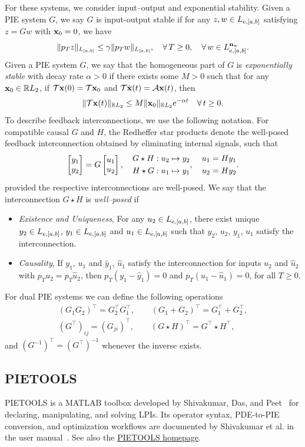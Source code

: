 For these systems, we consider input--output and exponential stability. 
Given a PIE system $G$, we say $G$ is input-output stable if for any $z, w \in L_{{\mathrm{e}},[a,b]}$ satisfying $z = G w$ with $\mathbf{x}_0=0$, we have
\[
\|p_T z\|_{L_{[a,b]}}
\leq
\gamma\|p_T w\|_{L_{[a,b]}},
\quad
\forall\,T\geq0,\quad
\forall\,w\in L_{{\mathrm{e}},[a,b]}^{\mathbf{n}_{{\mathrm{w}}}}.
\]
Given a PIE system $G$, we say that the homogeneous part of $G$
is \emph{exponentially stable} with decay rate $\alpha>0$ if there exists
some $M>0$ such that for any $\mathbf{x}_0\in\mathbb{R} L_2$,
if $\mathcal{T}\mathbf{x}(0) = \mathcal{T}\mathbf{x}_0$ and $\mathcal{T}\dot{\mathbf{x}}(t)
=\mathcal{A}\mathbf{x}(t)$, then
\[\|\mathcal{T}\mathbf{x}(t)\|_{\mathbb{R} L_2} \leq M\|\mathbf{x}_0\|_{\mathbb{R} L_2} e^{-\alpha t} \quad\forall\, t\geq 0.\]
To describe feedback interconnections, we use the following notation.
For compatible causal $G$ and $H$, the Redheffer star
products denote the well-posed feedback interconnection obtained by
eliminating internal signals, such that
\[
\begin{bmatrix}y_1\\y_2\end{bmatrix}=G\begin{bmatrix}u_1\\u_2\end{bmatrix},\quad \begin{aligned}
&G\star H:u_2\mapsto y_2\\ &H\star G:u_1\mapsto y_1
\end{aligned}, \quad \begin{aligned}
&u_1=Hy_1\\ &u_2=Hy_2
\end{aligned}.
\]
provided the respective interconnections are well-posed.
We say that the interconnection $G\star H$ is
\emph{well--posed} if
\begin{itemize}
\item \emph{Existence and Uniqueness}, For any
$u_2\in L_{{\mathrm{e}}, [a,b]}$, there exist unique
$y_2\in L_{{\mathrm{e}}, [a,b]}$,
$y_1 \in L_{{\mathrm{e}}, [a,b]}$ and
$u_1 \in  L_{{\mathrm{e}}, [a,b]}$ such that $y_2$, $u_2$,
$y_1$, $u_1$ satisfy the interconnection.
\item \emph{Causality}, If $y_1$, $u_1$ and
$\hat{y}_1$, $\hat{u}_1$ satisfy the interconnection for inputs
$u_2$ and $\hat u_2$ with $p_Tu_2=p_T\hat u_2$,
then $p_T(y_1 - \hat{y}_1) = 0$ and
$p_T(u_1 - \hat{u}_1) = 0$, for all
$T \geq 0$.
\end{itemize}
For dual PIE systems we can define the following operations
\begin{gather*}
(G_1G_2)^\top=G_2^\top G_1^\top,\qquad
(G_1+G_2)^\top=G_1^\top+G_2^\top,\\
(G^\top)_{ij}=(G_{ji})^\top,\qquad
(G\star H)^\top=G^\top\star H^\top,
\end{gather*}
and $(G^{-1})^\top=(G^\top)^{-1}$ whenever the inverse exists.

\subsection{PIETOOLS}
PIETOOLS is a MATLAB toolbox developed by Shivakumar, Das, and
Peet~\cite{9147712} for declaring, manipulating, and solving LPIs. Its operator
syntax, PDE-to-PIE conversion, and optimization workflows are documented by
Shivakumar et al. in the user manual~\cite{pietools2025manual}. See also the
\href{https://control.asu.edu/pietools/pietools}{PIETOOLS homepage}.
